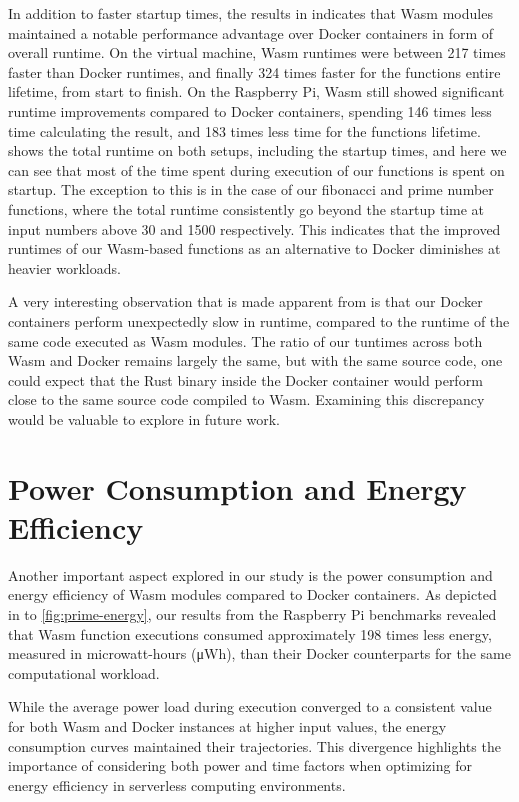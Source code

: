 \documentclass[
  table]{report}
\begin{document}
In addition to faster startup times, the results in
 indicates that \ac{Wasm} modules
maintained a notable performance advantage over Docker containers in
form of overall runtime. On the virtual machine, \ac{Wasm} runtimes were
between 217 times faster than Docker runtimes, and finally 324 times
faster for the functions entire lifetime, from start to finish. On the
Raspberry Pi, \ac{Wasm} still showed significant runtime improvements
compared to Docker containers, spending 146 times less time calculating
the result, and 183 times less time for the functions lifetime.
 shows the total runtime
on both setups, including the startup times, and here we can see that
most of the time spent during execution of our functions is spent on
startup. The exception to this is in the case of our fibonacci and prime
number functions, where the total runtime consistently go beyond the
startup time at input numbers above 30 and 1500 respectively. This
indicates that the improved runtimes of our \ac{Wasm}-based functions as
an alternative to Docker diminishes at heavier workloads.

A very interesting observation that is made apparent from
 is that our Docker containers perform
unexpectedly slow in runtime, compared to the runtime of the same code
executed as \ac{Wasm} modules. The ratio of our tuntimes across both
\ac{Wasm} and Docker remains largely the same, but with the same source
code, one could expect that the Rust binary inside the Docker container
would perform close to the same source code compiled to \ac{Wasm}.
Examining this discrepancy would be valuable to explore in future work.

\section{Power Consumption and Energy Efficiency}

Another important aspect explored in our study is the power consumption
and energy efficiency of \ac{Wasm} modules compared to Docker
containers. As depicted in  to
\cref{fig:prime-energy}, our results from the Raspberry Pi benchmarks
revealed that \ac{Wasm} function executions consumed approximately 198
times less energy, measured in microwatt-hours (μWh), than their Docker
counterparts for the same computational workload.

While the average power load during execution converged to a consistent
value for both \ac{Wasm} and Docker instances at higher input values,
the energy consumption curves maintained their trajectories. This
divergence highlights the importance of considering both power and time
factors when optimizing for energy efficiency in serverless computing
environments.
\end{document}
